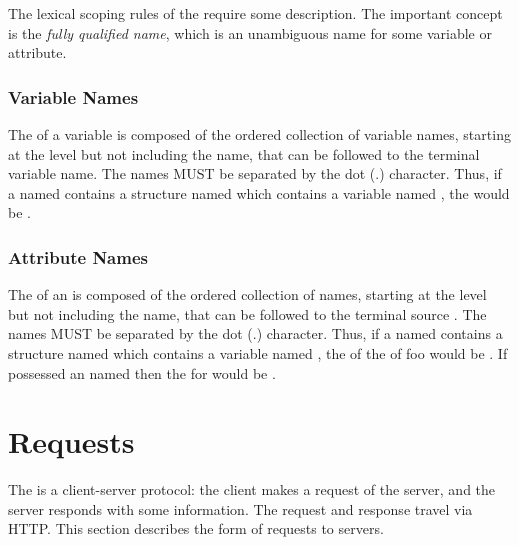\documentclass[justify]{nasa-ese}
\renewcommand{\new}[1]{\emph{#1}}
\begin{document}
The lexical scoping rules of the \DAP require some description. The
important concept is the \new{fully qualified name}, which is an
unambiguous name for some variable or attribute.

\subsubsection{Variable Names}

The \FQN of a variable is composed of the ordered collection of variable
names, starting at the \Dataset level but not including the \Dataset name,
that can be followed to the terminal variable name. The names MUST be
separated by the dot (.) character. Thus, if a \Dataset named 
contains a structure named  which contains a variable named
, the \FQN would be .

\subsubsection{Attribute Names}

The \FQN of an \Attribute is composed of the ordered collection of \Attribute
names, starting at the \Dataset level but not including the \Dataset name,
that can be followed to the terminal source \Attribute. The names MUST be
separated by the dot (.) character. Thus, if a \Dataset named 
contains a structure named  which contains a variable named
, the \FQN of the \Attributes of foo would be . If
 possessed an \Attribute named  then the \FQN for
 would be .



\section{Requests}
\label{sec-requests}

The \DAP is a client-server protocol: the client makes a request
of the server, and the server responds with some information.  The
request and response travel via \ac{HTTP}.  This section describes the form
of requests to servers.
\end{document}
